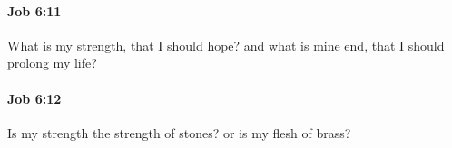 		\paragraph{Job 6:11} %
			\label{JOB-6-11}

			What is my strength, that I should hope? and what is mine end, that I should prolong my life?


		\paragraph{Job 6:12} %
			\label{JOB-6-12}

			Is my strength the strength of stones? or is my flesh of brass?



